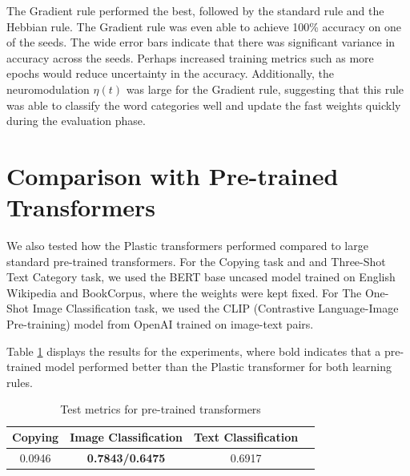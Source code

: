 \documentclass{article}
\begin{document}
The Gradient rule performed the best, followed by the standard rule and the Hebbian rule. The Gradient rule was even able to achieve 100\% accuracy on one of the seeds. The wide error bars indicate that there was significant variance in accuracy across the seeds. Perhaps increased training metrics such as more epochs would reduce uncertainty in the accuracy. Additionally, the neuromodulation $\eta(t)$ was large for the Gradient rule, suggesting that this rule was able to classify the word categories well and update the fast weights quickly during the evaluation phase. 



\section{Comparison with Pre-trained Transformers}

We also tested how the Plastic transformers performed compared to large standard pre-trained transformers. For the Copying task and and Three-Shot Text Category task, we used the BERT base uncased model trained on English Wikipedia and BookCorpus, where the weights were kept fixed. For The One-Shot Image Classification task, we used the CLIP (Contrastive Language-Image Pre-training) model from OpenAI trained on image-text pairs.

Table \ref{tab:pre_trained results2} displays the results for the experiments, where bold indicates that a pre-trained model performed better than the Plastic transformer for both learning rules. 

\begin{table}[h]
    \centering
    \begin{tabular}{|c|c|c|c|}
        \hline
          Copying & Image Classification & Text Classification\\
        \hline
        0.0946 & \textbf{0.7843/0.6475}   & 0.6917 \\
        \hline
    \end{tabular}
    \caption{Test metrics for pre-trained transformers}
    \label{tab:pre_trained results2}
\end{table}
\end{document}
